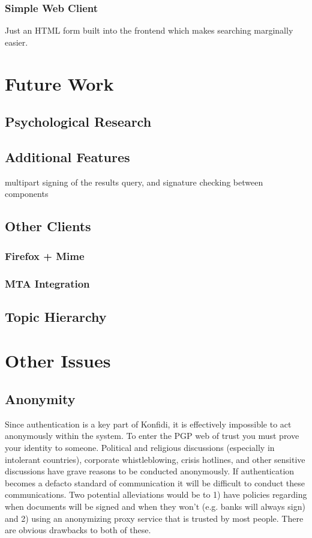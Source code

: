 \documentclass[onecolumn]{acm_proc_article-sp}
\begin{document}
\subsubsection{Simple Web Client}
Just an HTML form built into the frontend which makes searching marginally easier.

\section{Future Work}
\subsection{Psychological Research}
\subsection{Additional Features}
multipart signing of the results query, and signature checking between components
\subsection{Other Clients}
\subsubsection{Firefox + Mime}
\subsubsection{MTA Integration}
\subsection{Topic Hierarchy}
\section{Other Issues}
\subsection{Anonymity}
Since authentication is a key part of Konfidi, it is effectively impossible to act anonymously within the system.  To enter the PGP web of trust you must prove your identity to someone.  Political and religious discussions (especially in intolerant countries), corporate whistleblowing, crisis hotlines, and other sensitive discussions have grave reasons to be conducted anonymously.  If authentication becomes a defacto standard of communication it will be difficult to conduct these communications.  Two potential alleviations would be to 1) have policies regarding when documents will be signed and when they won't (e.g. banks will always sign) and 2) using an anonymizing proxy service that is trusted by most people.  There are obvious drawbacks to both of these.\cite{fenton05iim}
\end{document}
